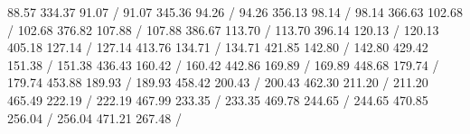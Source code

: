 { 88.57 334.37 91.07 /
 91.07 345.36 94.26 /
 94.26 356.13 98.14 /
 98.14 366.63 102.68 /
 102.68 376.82 107.88 /
 107.88 386.67 113.70 /
 113.70 396.14 120.13 /
 120.13 405.18 127.14 /
 127.14 413.76 134.71 /
 134.71 421.85 142.80 /
 142.80 429.42 151.38 /
 151.38 436.43 160.42 /
 160.42 442.86 169.89 /
 169.89 448.68 179.74 /
 179.74 453.88 189.93 /
 189.93 458.42 200.43 /
 200.43 462.30 211.20 /
 211.20 465.49 222.19 /
 222.19 467.99 233.35 /
 233.35 469.78 244.65 /
 244.65 470.85 256.04 /
 256.04 471.21 267.48 /
\endpicture
}
